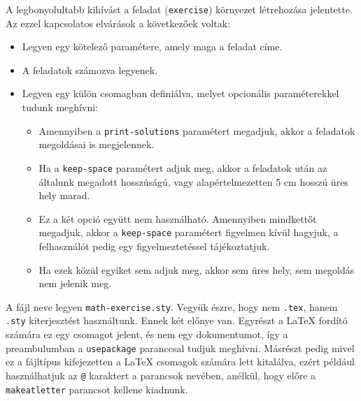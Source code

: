 A legbonyolultabb kihívást a feladat (\texttt{exercise}) környezet létrehozása
jelentette. Az ezzel kapcsolatos elvárások a következőek voltak:
\begin{itemize}
	\item Legyen egy kötelező paramétere, amely maga a feladat címe.


	\item A feladatok számozva legyenek.


	\item Legyen egy külön csomagban definiálva, melyet opcionális paraméterekkel
	      tudunk meghívni:

	      \begin{itemize}
		      \item Amennyiben a \texttt{print-solutions} paramétert megadjuk,
		            akkor a feladatok megoldásai is megjelennek.

		      \item Ha a \texttt{keep-space} paramétert adjuk meg, akkor
		            a feladatok után az általunk megadott hosszúságú, vagy
		            alapértelmezetten 5 cm hosszú üres hely marad.

		      \item Ez a két opció együtt nem használható. Amennyiben mindkettőt
		            megadjuk, akkor a \texttt{keep-space} paramétert figyelmen kívül
		            hagyjuk, a felhasználót pedig egy figyelmeztetéssel
		            tájékoztatjuk.

		      \item Ha ezek közül egyiket sem adjuk meg, akkor sem üres hely,
		            sem megoldás nem jelenik meg.
	      \end{itemize}
\end{itemize}

A fájl neve legyen \texttt{math-exercise.sty}. Vegyük észre, hogy nem
\texttt{.tex}, hanem \texttt{.sty} kiterjesztést használtunk. Ennek két előnye
van. Egyrészt a \LaTeX{} fordító számára ez egy csomagot jelent, és nem egy
dokumentumot, így a preambulumban a \texttt{usepackage} paranccsal tudjuk
meghívni. Másrészt pedig mivel ez a fájltípus kifejezetten a \LaTeX{} csomagok
számára lett kitalálva, ezért például használhatjuk az \texttt{@} karaktert
a parancsok nevében, anélkül, hogy előre a \texttt{makeatletter} parancsot
kellene kiadnunk.

